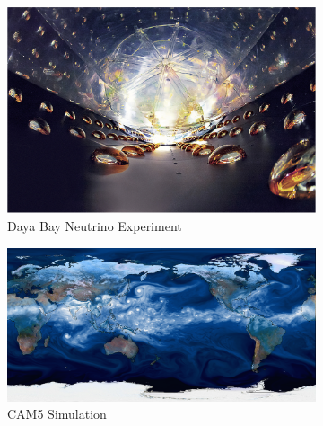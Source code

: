 \begin{figure}
\centering
\begin{subfigure}[b]{0.32\textwidth}
\includegraphics[width=\textwidth]{fig/dayabay.jpg}
\caption{Daya Bay Neutrino Experiment}
\label{fig:dayabay}
\end{subfigure}
\begin{subfigure}[b]{0.42\textwidth}
\includegraphics[width=\textwidth]{fig/climate.png}
\caption{CAM5 Simulation}
\label{fig:cam5}
\end{subfigure}
\begin{subfigure}[b]{0.22\textwidth}

\end{subfigure}
\end{figure}
